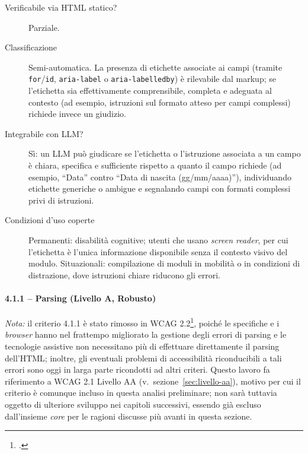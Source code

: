 \begin{description}

\item[Verificabile via HTML statico?] Parziale.

\item[Classificazione] Semi-automatica. La presenza di etichette associate ai campi (tramite \texttt{for}/\texttt{id}, \texttt{aria-label} o \texttt{aria-labelledby}) è rilevabile dal markup; se l'etichetta sia effettivamente comprensibile, completa e adeguata al contesto (ad esempio, istruzioni sul formato atteso per campi complessi) richiede invece un giudizio.

\item[Integrabile con LLM?] Sì: un LLM può giudicare se l'etichetta o l'istruzione associata a un campo è chiara, specifica e sufficiente rispetto a quanto il campo richiede (ad esempio, \enquote{Data} contro \enquote{Data di nascita (gg/mm/aaaa)}), individuando etichette generiche o ambigue e segnalando campi con formati complessi privi di istruzioni.

\item[Condizioni d'uso coperte] Permanenti: disabilità cognitive; utenti che usano \emph{screen reader}, per cui l'etichetta è l'unica informazione disponibile senza il contesto visivo del modulo. Situazionali: compilazione di moduli in mobilità o in condizioni di distrazione, dove istruzioni chiare riducono gli errori.

\end{description}

\paragraph*{4.1.1 -- Parsing (Livello A, Robusto)}

\textit{Nota:} il criterio 4.1.1 è stato rimosso in WCAG 2.2\footcite{w3c:wcag22-changes}, poiché le specifiche e i \emph{browser} hanno nel frattempo migliorato la gestione degli errori di parsing e le tecnologie assistive non necessitano più di effettuare direttamente il parsing dell'HTML; inoltre, gli eventuali problemi di accessibilità riconducibili a tali errori sono oggi in larga parte ricondotti ad altri criteri. Questo lavoro fa riferimento a WCAG 2.1 Livello AA (v.~sezione~\ref{sec:livello-aa}), motivo per cui il criterio è comunque incluso in questa analisi preliminare; non sarà tuttavia oggetto di ulteriore sviluppo nei capitoli successivi, essendo già escluso dall'insieme \emph{core} per le ragioni discusse più avanti in questa sezione.


